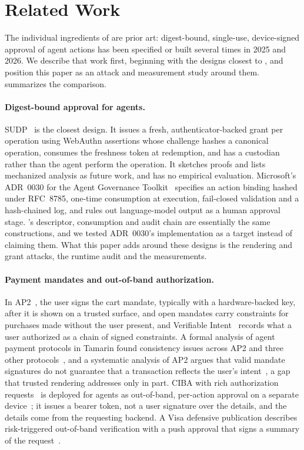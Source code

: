 \section{Related Work}\label{sec:related}

The individual ingredients of \sys{} are prior art: digest-bound, single-use, device-signed approval of agent
actions has been specified or built several times in 2025 and 2026. We describe that work first,
beginning with the designs closest to \sys{}, and position this paper as an attack and measurement study around
them.  summarizes the comparison.

\paragraph{Digest-bound approval for agents.} SUDP~\citep{yu2026sudp} is the closest design. It issues a fresh,
authenticator-backed grant per operation using WebAuthn assertions whose challenge hashes a canonical operation,
consumes the freshness token at redemption, and has a custodian rather than the agent perform the operation. It
sketches proofs and lists mechanized analysis as future work, and has no empirical evaluation. Microsoft's ADR~0030
for the Agent Governance Toolkit~\citep{microsoft2026adr0030} specifies an action binding hashed under RFC~8785,
one-time consumption at execution, fail-closed validation and a hash-chained log, and rules out language-model
output as a human approval stage. \sys{}'s descriptor, consumption and audit chain are essentially the same
constructions, and we tested ADR~0030's implementation as a target instead of claiming them. What this paper adds
around these designs is the rendering and grant attacks, the runtime audit and the measurements.

\paragraph{Payment mandates and out-of-band authorization.} In AP2~\citep{ap2spec}, the user signs the cart mandate,
typically with a hardware-backed key, after it is shown on a trusted surface, and open mandates carry constraints
for purchases made without the user present, and Verifiable
Intent~\citep{mastercard2026vi} records what a user authorized as a chain of signed constraints. A formal analysis
of agent payment protocols in Tamarin found consistency issues across AP2 and three other
protocols~\citep{jiang2026payment}, and a systematic analysis of AP2 argues that valid mandate signatures do not
guarantee that a transaction reflects the user's intent~\citep{aviv2026ap2}, a gap that trusted rendering
addresses only in part. CIBA with rich authorization requests~\citep{ciba2021,rfc9396} is deployed for agents as out-of-band,
per-action approval on a separate device~\citep{auth0asyncauth}; it issues a bearer token, not a user signature
over the details, and the details come from the requesting backend. A Visa defensive publication describes risk-triggered out-of-band
verification with a push approval that signs a summary of the request~\citep{vyas2026visamfa}.

